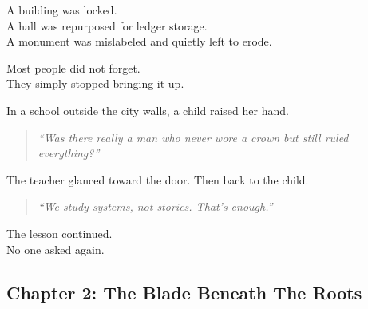 \documentclass[9pt]{article}
\begin{document}
\vspace{1em}

A building was locked.\\
A hall was repurposed for ledger storage.\\
A monument was mislabeled and quietly left to erode.

Most people did not forget.\\
They simply stopped bringing it up.

\vspace{1em}

In a school outside the city walls, a child raised her hand.

\begin{quote}
\textit{“Was there really a man who never wore a crown but still ruled everything?”}
\end{quote}

The teacher glanced toward the door. Then back to the child.

\begin{quote}
\textit{“We study systems, not stories. That’s enough.”}
\end{quote}

The lesson continued.\\
No one asked again.

\newpage

\subsection*{Chapter 2: The Blade Beneath The Roots}

\vspace{1in}
\end{document}
